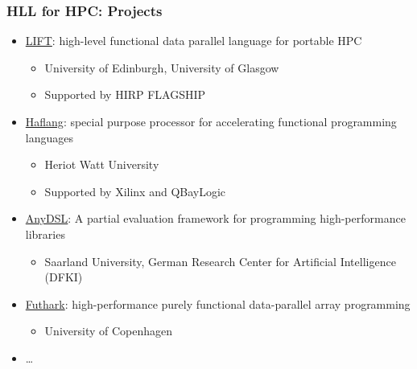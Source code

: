 \documentclass[xcolor=table,aspectratio=169]{beamer}
\begin{document}
\begin{frame}[fragile]
  \frametitle{HLL for HPC: Projects}

  \begin{itemize}
    \item \href{https://www.lift-project.org/}{LIFT}: high-level functional data parallel language for portable HPC 
    \begin{itemize}
      \item University of Edinburgh, University of Glasgow      
      \item Supported by HIRP FLAGSHIP
    \end{itemize}
    \item \href{https://haflang.github.io/}{Haflang}: special purpose processor for accelerating functional programming languages 
    \begin{itemize}
      \item Heriot Watt University
      \item Supported by Xilinx and QBayLogic
    \end{itemize}    
    \item \href{https://anydsl.github.io/}{AnyDSL}: A partial evaluation framework for programming high-performance libraries 
    \begin{itemize}
      \item Saarland University, German Research Center for Artificial Intelligence (DFKI)      
    \end{itemize}
    \item \href{https://futhark-lang.org/}{Futhark}: high-performance purely functional data-parallel array programming 
    \begin{itemize}
      \item University of Copenhagen      
    \end{itemize}
    \item \ldots
  \end{itemize}
\end{frame}
\end{document}
